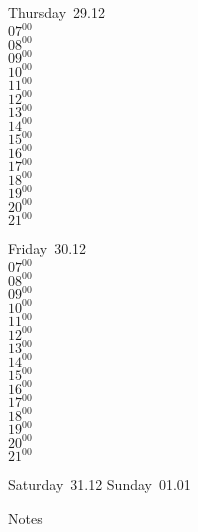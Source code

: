 \documentclass[11pt,a4paper]{book}\usepackage[]{graphicx}\usepackage[]{color}
\begin{document}
\clearpage
\begin{headerbox}
\end{headerbox}
\begin{weekdaybox}
  Thursday~29.12\\
  { 
  \vfill
  $07^{00}$\\
$08^{00}$\\
$09^{00}$\\
$10^{00}$\\
$11^{00}$\\
$12^{00}$\\
$13^{00}$\\
$14^{00}$\\
$15^{00}$\\
$16^{00}$\\
$17^{00}$\\
$18^{00}$\\
$19^{00}$\\
$20^{00}$\\
$21^{00}$\\
  }
\end{weekdaybox} 
\begin{weekdaybox}
  Friday~30.12\\
  { 
  \vfill
  $07^{00}$\\
$08^{00}$\\
$09^{00}$\\
$10^{00}$\\
$11^{00}$\\
$12^{00}$\\
$13^{00}$\\
$14^{00}$\\
$15^{00}$\\
$16^{00}$\\
$17^{00}$\\
$18^{00}$\\
$19^{00}$\\
$20^{00}$\\
$21^{00}$\\
  }
\end{weekdaybox}
\begin{weekendbox}
  Saturday~31.12
  \tcblower
  Sunday~01.01
\end{weekendbox} %
\begin{notebox}
  Notes
\end{notebox}
\clearpage
\end{document}

